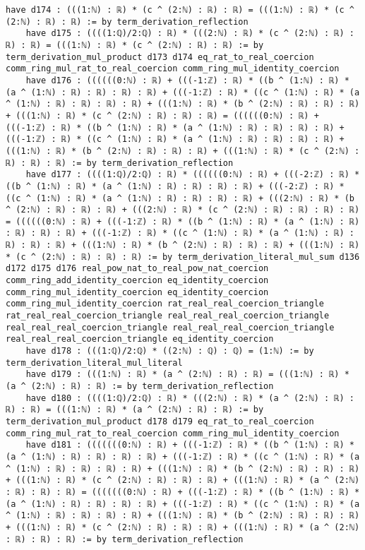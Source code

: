 \documentclass{article}
\begin{document}
\begin{tcolorbox}[colback=white!10, width=\linewidth]
\begin{lstlisting}[language=Lean4]
    have d174 : (((1:ℕ) : ℝ) * (c ^ (2:ℕ) : ℝ) : ℝ) = (((1:ℕ) : ℝ) * (c ^ (2:ℕ) : ℝ) : ℝ) := by term_derivation_reflection
    have d175 : ((((1:ℚ)/2:ℚ) : ℝ) * (((2:ℕ) : ℝ) * (c ^ (2:ℕ) : ℝ) : ℝ) : ℝ) = (((1:ℕ) : ℝ) * (c ^ (2:ℕ) : ℝ) : ℝ) := by term_derivation_mul_product d173 d174 eq_rat_to_real_coercion comm_ring_mul_rat_to_real_coercion comm_ring_mul_identity_coercion
    have d176 : ((((((0:ℕ) : ℝ) + (((-1:ℤ) : ℝ) * ((b ^ (1:ℕ) : ℝ) * (a ^ (1:ℕ) : ℝ) : ℝ) : ℝ) : ℝ) + (((-1:ℤ) : ℝ) * ((c ^ (1:ℕ) : ℝ) * (a ^ (1:ℕ) : ℝ) : ℝ) : ℝ) : ℝ) + (((1:ℕ) : ℝ) * (b ^ (2:ℕ) : ℝ) : ℝ) : ℝ) + (((1:ℕ) : ℝ) * (c ^ (2:ℕ) : ℝ) : ℝ) : ℝ) = ((((((0:ℕ) : ℝ) + (((-1:ℤ) : ℝ) * ((b ^ (1:ℕ) : ℝ) * (a ^ (1:ℕ) : ℝ) : ℝ) : ℝ) : ℝ) + (((-1:ℤ) : ℝ) * ((c ^ (1:ℕ) : ℝ) * (a ^ (1:ℕ) : ℝ) : ℝ) : ℝ) : ℝ) + (((1:ℕ) : ℝ) * (b ^ (2:ℕ) : ℝ) : ℝ) : ℝ) + (((1:ℕ) : ℝ) * (c ^ (2:ℕ) : ℝ) : ℝ) : ℝ) := by term_derivation_reflection
    have d177 : ((((1:ℚ)/2:ℚ) : ℝ) * ((((((0:ℕ) : ℝ) + (((-2:ℤ) : ℝ) * ((b ^ (1:ℕ) : ℝ) * (a ^ (1:ℕ) : ℝ) : ℝ) : ℝ) : ℝ) + (((-2:ℤ) : ℝ) * ((c ^ (1:ℕ) : ℝ) * (a ^ (1:ℕ) : ℝ) : ℝ) : ℝ) : ℝ) + (((2:ℕ) : ℝ) * (b ^ (2:ℕ) : ℝ) : ℝ) : ℝ) + (((2:ℕ) : ℝ) * (c ^ (2:ℕ) : ℝ) : ℝ) : ℝ) : ℝ) = ((((((0:ℕ) : ℝ) + (((-1:ℤ) : ℝ) * ((b ^ (1:ℕ) : ℝ) * (a ^ (1:ℕ) : ℝ) : ℝ) : ℝ) : ℝ) + (((-1:ℤ) : ℝ) * ((c ^ (1:ℕ) : ℝ) * (a ^ (1:ℕ) : ℝ) : ℝ) : ℝ) : ℝ) + (((1:ℕ) : ℝ) * (b ^ (2:ℕ) : ℝ) : ℝ) : ℝ) + (((1:ℕ) : ℝ) * (c ^ (2:ℕ) : ℝ) : ℝ) : ℝ) := by term_derivation_literal_mul_sum d136 d172 d175 d176 real_pow_nat_to_real_pow_nat_coercion comm_ring_add_identity_coercion eq_identity_coercion comm_ring_mul_identity_coercion eq_identity_coercion comm_ring_mul_identity_coercion rat_real_real_coercion_triangle rat_real_real_coercion_triangle real_real_real_coercion_triangle real_real_real_coercion_triangle real_real_real_coercion_triangle real_real_real_coercion_triangle eq_identity_coercion
    have d178 : (((1:ℚ)/2:ℚ) * ((2:ℕ) : ℚ) : ℚ) = (1:ℕ) := by term_derivation_literal_mul_literal
    have d179 : (((1:ℕ) : ℝ) * (a ^ (2:ℕ) : ℝ) : ℝ) = (((1:ℕ) : ℝ) * (a ^ (2:ℕ) : ℝ) : ℝ) := by term_derivation_reflection
    have d180 : ((((1:ℚ)/2:ℚ) : ℝ) * (((2:ℕ) : ℝ) * (a ^ (2:ℕ) : ℝ) : ℝ) : ℝ) = (((1:ℕ) : ℝ) * (a ^ (2:ℕ) : ℝ) : ℝ) := by term_derivation_mul_product d178 d179 eq_rat_to_real_coercion comm_ring_mul_rat_to_real_coercion comm_ring_mul_identity_coercion
    have d181 : (((((((0:ℕ) : ℝ) + (((-1:ℤ) : ℝ) * ((b ^ (1:ℕ) : ℝ) * (a ^ (1:ℕ) : ℝ) : ℝ) : ℝ) : ℝ) + (((-1:ℤ) : ℝ) * ((c ^ (1:ℕ) : ℝ) * (a ^ (1:ℕ) : ℝ) : ℝ) : ℝ) : ℝ) + (((1:ℕ) : ℝ) * (b ^ (2:ℕ) : ℝ) : ℝ) : ℝ) + (((1:ℕ) : ℝ) * (c ^ (2:ℕ) : ℝ) : ℝ) : ℝ) + (((1:ℕ) : ℝ) * (a ^ (2:ℕ) : ℝ) : ℝ) : ℝ) = (((((((0:ℕ) : ℝ) + (((-1:ℤ) : ℝ) * ((b ^ (1:ℕ) : ℝ) * (a ^ (1:ℕ) : ℝ) : ℝ) : ℝ) : ℝ) + (((-1:ℤ) : ℝ) * ((c ^ (1:ℕ) : ℝ) * (a ^ (1:ℕ) : ℝ) : ℝ) : ℝ) : ℝ) + (((1:ℕ) : ℝ) * (b ^ (2:ℕ) : ℝ) : ℝ) : ℝ) + (((1:ℕ) : ℝ) * (c ^ (2:ℕ) : ℝ) : ℝ) : ℝ) + (((1:ℕ) : ℝ) * (a ^ (2:ℕ) : ℝ) : ℝ) : ℝ) := by term_derivation_reflection

\end{lstlisting}
\end{tcolorbox}
\end{document}
